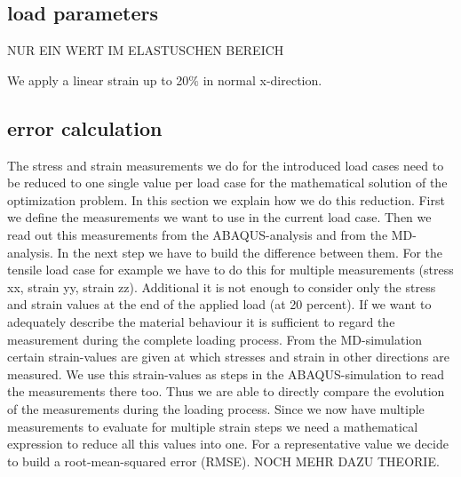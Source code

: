     \subsection{load parameters}
    NUR EIN WERT IM ELASTUSCHEN BEREICH

     We apply a linear strain up to 20\(\%\) in normal x-direction.

    

    \subsection{error calculation}
    The stress and strain measurements we do for the introduced load cases need to be reduced to one single value per load case for the mathematical solution of the optimization problem. 
    In this section we explain how we do this reduction. 
    First we define the measurements we want to use in the current load case. Then we read out this measurements from the ABAQUS-analysis and from the MD-analysis. In the next step we have to build the difference between them. For the tensile load case for example we have to do this for multiple measurements (stress xx, strain yy, strain zz). Additional it is not enough to consider only the stress and strain values at the end of the applied load (at 20 percent). If we want to adequately describe the material behaviour it is sufficient to regard the measurement during the complete loading process. From the MD-simulation certain strain-values are given at which stresses and strain in other directions are measured. We use this strain-values as steps in the ABAQUS-simulation to read the measurements there too. Thus we are able to directly compare the evolution of the measurements during the loading process. Since we now have multiple measurements to evaluate for multiple strain steps we need a mathematical expression to reduce all this values into one. For a representative value we decide to build a root-mean-squared error (RMSE). NOCH MEHR DAZU THEORIE. 
